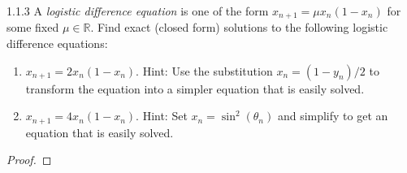 \begin{problem}{1.1.3}
  A \emph{logistic difference equation} is one of the form $x_{n+1} = \mu x_{n} (1-x_n)$
  for some fixed $\mu \in \mathbb{R}$. Find exact (closed form) solutions to the following
  logistic difference equations:
  \begin{enumerate}
    \item $x_{n+1} = 2 x_{n} (1 - x_n)$. Hint: Use the substitution $x_n = (1 - y_n) / 2$
      to transform the equation into a simpler equation that is easily solved.
    \item $x_{n+1} = 4 x_n (1 - x_n)$. Hint: Set $x_n = \sin^2(\theta_n)$ and simplify
      to get an equation that is easily solved.
  \end{enumerate}
\end{problem}

\begin{proof}
\end{proof}
\newpage
